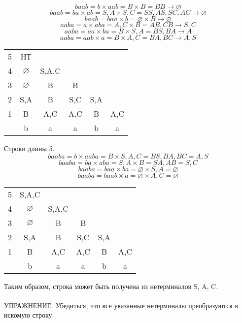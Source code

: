\documentclass{article}
\begin{document}
$$baab = b\times aab = B \times B = BB \rightarrow \varnothing$$
$$baab = ba\times ab = S,A \times S,C = SS, AS, SC, AC \rightarrow \varnothing$$
$$baab = baa\times b = \varnothing \times B \rightarrow \varnothing$$
$$aaba = a\times aba = A,C \times B = AB, CB \rightarrow S, C$$
$$aaba = aa\times ba = B \times S,A = BS, BA \rightarrow A$$
$$aaba = aab\times a = B \times A,C = BA, BC \rightarrow A,S$$
\begin{center}
    \begin{tabular}{ c|c c c c c }
    5 & НТ  \\ 
    4 & $\varnothing$ & S,A,C   \\  
    3 & $\varnothing$ & B & B   \\  
    2 & S,A & B & S,C & S,A  \\  
    1 & B & A,C & A,C & B & A,C  \\
    \hline
      & b  &  a &  a & b  &  a 
    \end{tabular}
\end{center}
Строки длины 5. 
$$baaba = b\times aaba = B \times S,A,C = BS, BA, BC = A, S$$
$$baaba = ba\times aba = S,A \times B = SA, AB = S,C$$
$$baaba = baa\times ba = \varnothing \times S,A = \varnothing$$
$$baaba = baab\times a = \varnothing \times A,C = \varnothing$$
\begin{center}
    \begin{tabular}{ c|c c c c c }
    5 & S,A,C  \\ 
    4 & $\varnothing$ & S,A,C   \\  
    3 & $\varnothing$ & B & B   \\  
    2 & S,A & B & S,C & S,A  \\  
    1 & B & A,C & A,C & B & A,C  \\
    \hline
      & b  &  a &  a & b  &  a 
    \end{tabular}
\end{center}
Таким образом, строка может быть получена из нетерминалов S, A, C.\\\\
УПРАЖНЕНИЕ. 
Убедиться, что все указанные нетерминалы преобразуются в искомую строку. 
\end{document}
